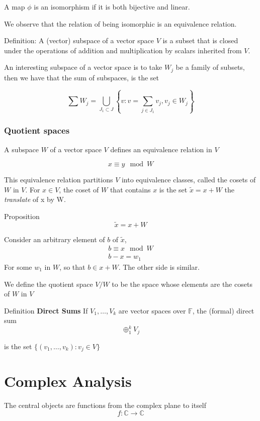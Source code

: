 \documentclass[11pt,twoside]{book}
\newcommand{\goesto}{\rightarrow}
\begin{document}
A map $\phi$ is an isomorphism if it is both bijective and linear.

We observe that the relation of being isomorphic is an equivalence relation.

Definition: A (vector) subspace of a vector space $V$ is a subset that is closed under the operations of addition and multiplication by scalars inherited from $V$.
 
An interesting subspace of a vector space is to take $W_j$ be a family of subsets, then we have that the sum of subspaces, is the set

\[
\sum W_j = \bigcup_{J_1 \subset J} \left\lbrace v : v = \sum_{j \in J_1} v_j, v_j \in W_j \right\rbrace 
\]

\subsection{Quotient spaces}

A subspace $W$ of a vector space $V$ defines an equivalence relation in $V$

\[
	x \equiv y  \mod W
\]

This equivalence relation partitions $V$  into equivalence classes, called the cosets of $W$ in $V$. For $ x \in V$, the coset of $W$ that contains $x$ is the set $\tilde{x} = x + W$ the \textit{translate} of x by W.

Proposition 
\[
	\tilde{x} = x + W
\]

Consider an  arbitrary element of $b$ of $ \tilde{x} $,
\begin{align*}
	b \equiv x \mod W \\
	b - x = w_1
\end{align*}
For some $w_1$ in $W$, so that $b \in x + W$. The other side is similar.

We define the quotient space $V/W$ to be the space whose elements are the cosets of $W$ in $V$

Definition \textbf{Direct Sums}
If $V_1, \ldots, V_k$ are vector spaces over $\mathbb{F}$, the (formal) direct sum
\[
	\oplus_1^k V_j 
\]

is the set $ \lbrace (v_1,\ldots,v_k) : v_j \in V \rbrace $


\chapter{Complex Analysis}

The central objects are functions from the complex plane to itself
\[
	f: \mathbb{C} \goesto \mathbb{C}
\]
\end{document}
